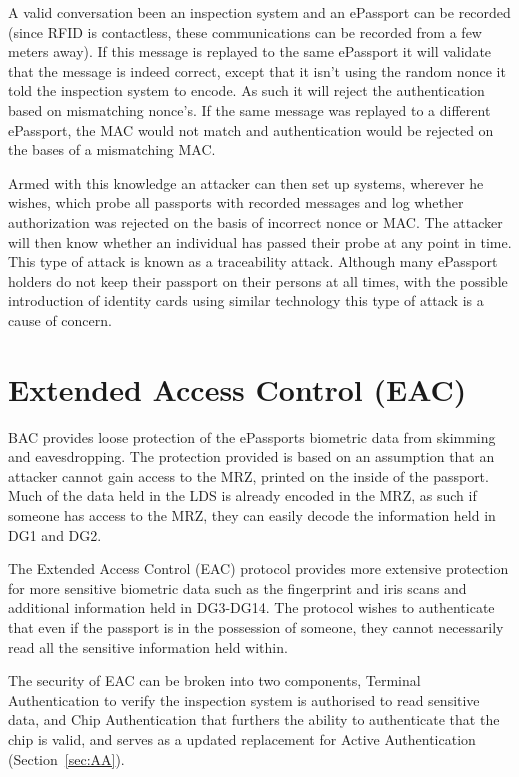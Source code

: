 \documentclass[12pt]{article}
\begin{document}
A valid conversation been an inspection system and an ePassport can be recorded (since RFID is contactless, these communications can be recorded from a few meters away). If this message is replayed to the same ePassport it will validate that the message is indeed correct, except that it isn't using the random nonce it told the inspection system to encode. As such it will reject the authentication based on mismatching nonce's. If the same message was replayed to a different ePassport, the MAC would not match and authentication would be rejected on the bases of a mismatching MAC.

Armed with this knowledge an attacker can then set up systems, wherever he wishes, which probe all passports with recorded messages and log whether authorization was rejected on the basis of incorrect nonce or MAC. The attacker will then know whether an individual has passed their probe at any point in time. This type of attack is known as a traceability attack. Although many ePassport holders do not keep their passport on their persons at all times, with the possible introduction of identity cards using similar technology this type of attack is a cause of concern.

\section{Extended Access Control (EAC)}
\label{sec:EAC}
BAC provides loose protection of the ePassports biometric data from skimming and eavesdropping. The protection provided is based on an assumption that an attacker cannot gain access to the MRZ, printed on the inside of the passport. Much of the data held in the LDS is already encoded in the MRZ, as such if someone has access to the MRZ, they can easily decode the information held in DG1 and DG2. 

The Extended Access Control (EAC) protocol provides more extensive protection for more sensitive biometric data such as the fingerprint and iris scans and additional information held in DG3-DG14. The protocol wishes to authenticate that even if the passport is in the possession of someone, they cannot necessarily read all the sensitive information held within.

The security of EAC can be broken into two components, Terminal Authentication to verify the inspection system is authorised to read sensitive data, and Chip Authentication that furthers the ability to authenticate that the chip is valid, and serves as a updated replacement for Active Authentication (Section~\ref{sec:AA}).
\end{document}
